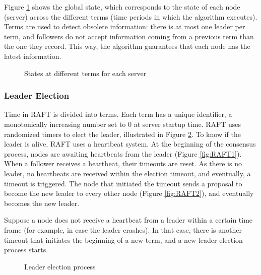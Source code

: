 \documentclass[12pt,a4paper]{article}
\begin{document}
Figure \ref{fig:state_empty} shows the global state, which corresponds to the state of each node (server) across the different terms (time periods in which the algorithm executes). Terms are used to detect obsolete information: there is at most one leader per term, and followers do not accept information coming from a previous term than the one they record. This way, the algorithm guarantees that each node has the latest information.

\begin{figure}
\centering
{}%
\qquad
{}%
\caption{States at different terms for each server}%
\label{fig:state_empty}%
\end{figure}


\subsubsection{Leader Election}
Time in RAFT is divided into terms. Each term has a unique identifier, a monotonically increasing number set to 0 at server startup time. RAFT uses randomized timers to elect the leader, illustrated in Figure  \ref{fig:le_1}. To know if the leader is alive, RAFT uses a heartbeat system. At the beginning of the consensus process, nodes are awaiting heartbeats from the leader (Figure \ref{fig:RAFT1}). When a follower receives a heartbeat, their timeouts are reset. As there is no leader, no heartbeats are received within the election timeout, and eventually, a timeout is triggered. The node that initiated the timeout sends a proposal to become the new leader to every other node (Figure \ref{fig:RAFT2}), and eventually becomes the new leader.

Suppose a node does not receive a heartbeat from a leader within a certain time frame (for example, in case the leader crashes). In that case, there is another timeout that initiates the beginning of a new term, and a new leader election process starts.

\begin{figure}
\centering
{}%
\qquad
{}%
\caption{Leader election process}%
\label{fig:le_1}%
\end{figure}
\end{document}
